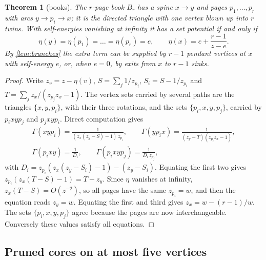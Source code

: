 \documentclass[11pt]{amsart}
\theoremstyle{plain}
\newtheorem{theorem}{Theorem}[section]
\theoremstyle{definition}
\theoremstyle{remark}
\numberwithin{equation}{section}
\begin{document}
\begin{theorem}[books]\label{thm:books}
The $r$-page book $B_r$ has a spine $x\to y$ and pages $p_1,\dots,p_r$ with arcs $y\to p_i\to x$; it is the directed triangle with one vertex blown up into $r$ twins. With self-energies vanishing at infinity it has a set potential if and only if
\[
\eta(y)=\eta(p_1)=\dots=\eta(p_r)=e,\qquad \eta(x)=e+\frac{r-1}{z-e}.
\]
By \cref{lem:branches} the extra term can be supplied by $r-1$ pendant vertices at $x$ with self-energy $e$, or, when $e=0$, by exits from $x$ to $r-1$ sinks.
\end{theorem}
\begin{proof}
Write $z_v=z-\eta(v)$, $S=\sum_j1/z_{p_j}$, $S_i=S-1/z_{p_i}$ and $T=\sum_jz_x/(z_{p_j}z_x-1)$. The vertex sets carried by several paths are the triangles $\{x,y,p_i\}$, with their three rotations, and the sets $\{p_i,x,y,p_j\}$, carried by $p_ixyp_j$ and $p_jxyp_i$. Direct computation gives
\begin{gather*}
\Gamma(xyp_i)=\frac{1}{(z_x(z_y-S)-1)\,z_{p_i}},\qquad \Gamma(yp_ix)=\frac{1}{(z_y-T)(z_{p_i}z_x-1)},\\
\Gamma(p_ixy)=\frac{1}{D_i},\qquad \Gamma(p_ixyp_j)=\frac{1}{D_i\,z_{p_j}},
\end{gather*}
with $D_i=z_{p_i}(z_x(z_y-S_i)-1)-(z_y-S_i)$. Equating the first two gives $z_{p_i}(z_x(T-S)-1)=T-z_y$. Since $\eta$ vanishes at infinity, $z_x(T-S)=O(z^{-2})$, so all pages have the same $z_{p_i}=w$, and then the equation reads $z_y=w$. Equating the first and third gives $z_x=w-(r-1)/w$. The sets $\{p_i,x,y,p_j\}$ agree because the pages are now interchangeable. Conversely these values satisfy all equations.
\end{proof}

\subsection{Pruned cores on at most five vertices}
\end{document}
